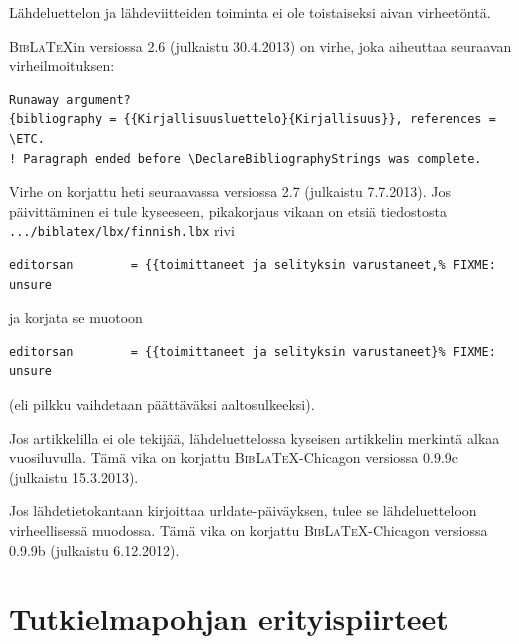 \documentclass[utf8]{gradu3-tjt}
\begin{document}
Lähdeluettelon ja lähdeviitteiden toiminta ei ole toistaiseksi aivan
virheetöntä.

\textsc{Bib\LaTeX}in versiossa 2.6 (julkaistu 30.4.2013) on virhe,
joka aiheuttaa seuraavan virheilmoituksen:%
{\footnotesize%
\begin{verbatim}
Runaway argument?
{bibliography = {{Kirjallisuusluettelo}{Kirjallisuus}}, references = \ETC.
! Paragraph ended before \DeclareBibliographyStrings was complete.
\end{verbatim}
}%
Virhe on korjattu heti seuraavassa versiossa 2.7 (julkaistu 7.7.2013).
Jos päivittäminen ei tule kyseeseen, pikakorjaus vikaan on etsiä
tiedostosta \texttt{.../biblatex/lbx/finnish.lbx} rivi%
{\footnotesize%
\begin{verbatim}
editorsan        = {{toimittaneet ja selityksin varustaneet,% FIXME: unsure
\end{verbatim}
}%
ja korjata se muotoon%
{\footnotesize%
\begin{verbatim}
editorsan        = {{toimittaneet ja selityksin varustaneet}% FIXME: unsure
\end{verbatim}
}%
(eli pilkku vaihdetaan päättäväksi aaltosulkeeksi).

Jos artikkelilla ei ole tekijää, lähdeluettelossa kyseisen artikkelin
merkintä alkaa vuosiluvulla.  Tämä vika on korjattu
\textsc{Bib\LaTeX}-Chicagon versiossa 0.9.9c (julkaistu 15.3.2013).

Jos lähdetietokantaan kirjoittaa urldate-päiväyksen, tulee se
lähdeluetteloon virheellisessä muodossa.  Tämä vika on korjattu
\textsc{Bib\LaTeX}-Chicagon versiossa 0.9.9b (julkaistu 6.12.2012).

\chapter{Tutkielmapohjan erityispiirteet}
\end{document}
